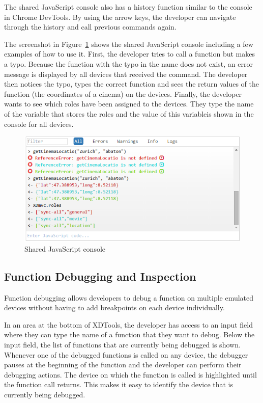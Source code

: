 The shared JavaScript console also has a history function similar to the console in Chrome DevTools. By using the arrow keys, the developer can navigate through the history and call previous commands again.

The screenshot in Figure~\ref{fig:js_console} shows the shared JavaScript console including a few examples of how to use it. First, the developer tries to call a function but makes a typo. Because the function with the typo in the name does not exist, an error message is displayed by all devices that received the command. The developer then notices the typo, types the correct function and sees the return values of the function (the coordinates of a cinema) on the devices. Finally, the developer wants to see which roles have been assigned to the devices. They type the name of the variable that stores the roles and the value of this variableis shown in the console for all devices.

\begin{figure}[H]
  \centering
    \includegraphics[width=1.0\textwidth]{images/screenshots/js_console_3.png}
	\caption[Screenshot: JavaScript console]{Shared JavaScript console}
	\label{fig:js_console}
\end{figure}

\subsection{Function Debugging and Inspection}

Function debugging allows developers to debug a function on multiple emulated devices without having to add breakpoints on each device individually.

In an area at the bottom of XDTools, the developer has access to an input field where they can type the name of a function that they want to debug. Below the input field, the list of functions that are currently being debugged is shown. Whenever one of the debugged functions is called on any device, the debugger pauses at the beginning of the function and the developer can perform their debugging actions. The device on which the function is called is highlighted until the function call returns. This makes it easy to identify the device that is currently being debugged.

